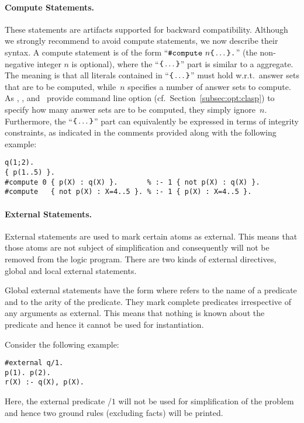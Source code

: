 \paragraph{Compute Statements.}
These statements are artifacts supported for backward compatibility.
Although we strongly recommend to avoid compute statements,
we now describe their syntax.
A compute statement is of the form
``$\const{\#compute}~n \code{\char`\{}\dots\code{\char`\}}\code{.}$''
(the non-negative integer $n$ is optional),
where the ``$\code{\char`\{}\dots\code{\char`\}}$'' part
is similar to a  aggregate.
The meaning is that all literals contained in
``$\code{\char`\{}\dots\code{\char`\}}$'' must hold w.r.t.\ answer sets
that are to be computed,
while~$n$ specifies a number of answer sets to compute.
As \clasp, \clingo, and \iclingo\ provide command line option
 (cf.\ Section~\ref{subsec:opt:clasp})
to specify how many answer sets are to be computed,
they simply ignore~$n$.
Furthermore,
the ``$\code{\char`\{}\dots\code{\char`\}}$'' part can equivalently
be expressed in terms of integrity constraints,
as indicated in the comments provided along with the following example:
%
\begin{lstlisting}[xrightmargin=-20pt,numbers=none]
q(1;2).
{ p(1..5) }.
#compute 0 { p(X) : q(X) }.       % :- 1 { not p(X) : q(X) }.
#compute   { not p(X) : X=4..5 }. % :- 1 { p(X) : X=4..5 }.
\end{lstlisting}

\paragraph{External Statements.}
External statements are used to mark certain atoms as external. This means 
that those atoms are not subject of simplification and consequently will not be removed 
from the logic program. There are two kinds of external directives, 
global and local external statements.

Global external statements have the form  where 
 refers to the name of a predicate and  to the arity of the predicate.
They mark complete predicates irrespective of any arguments as external.
This means that nothing is known about the predicate and hence it cannot be used 
for instantiation.
\begin{example}
Consider the following example:
\begin{lstlisting}[numbers=none]
#external q/1.
p(1). p(2).
r(X) :- q(X), p(X).
\end{lstlisting}
Here, the external predicate /$1$ will not be used for simplification
of the problem and hence two ground rules (excluding facts) will be printed.
\eexample
\end{example}

